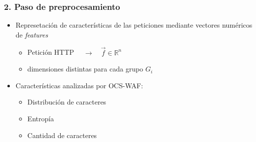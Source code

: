 \begin{frame}
    \frametitle{2. Paso de preprocesamiento}

    \begin{itemize}[<+(1)->]
        \item
        Represetación de características de las peticiones mediante
        vectores numéricos de \textit{features}

        \begin{itemize}[<.->]
            \item
            Petición HTTP $ \quad \rightarrow \quad \vec{f} \in \mathbb{R}^{n} $

            \item
            dimensiones distintas para cada grupo $G_{i}$
        \end{itemize}

        \item
        Características analizadas por OCS-WAF:

        \begin{itemize}[<.->]
            \item
            Distribución de caracteres

            \item
            Entropía

            \item
            Cantidad de caracteres
        \end{itemize}
    \end{itemize}
\end{frame}

